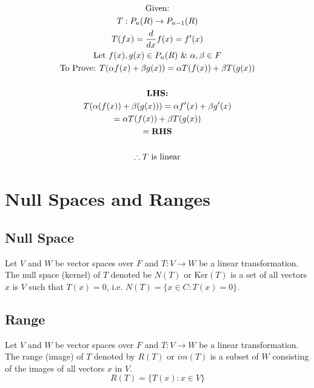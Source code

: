\documentclass[english,course,fleqn]{lecture}
\newenvironment{qanda}{\setlength{\parindent}{0pt}}{\bigskip}
\begin{document}
\begin{qanda}
  \begin{gather*}
    \text{Given:}\\
    T:P_{n}(R) \rightarrow P_{n-1}(R)\\
    T(f{x}) = \frac{d}{dx}{f(x)} = f'(x)\\
    \text{Let } f(x), g(x) \in P_{n}(R) ~\&~ \alpha, \beta \in F\\
    \text{To Prove: } T(\alpha f(x) + \beta g(x)) = \alpha T(f(x)) + \beta T(g(x))\\
    \\
    \text{\textbf{LHS:}}\\
    T(\alpha(f(x)) + \beta (g(x))) = \alpha f'(x) + \beta g'(x)\\
    = \alpha T(f(x)) + \beta T(g(x))\\
    = \text{\textbf{RHS}}\\
    \\
    \therefore \text{$T$ is linear}
  \end{gather*}
\end{qanda}

\newpage

\section{Null Spaces and Ranges}

\subsection{Null Space}

\begin{definition}
  Let $V$ and $W$ be vector spaces over $F$ and $T:V\rightarrow W$ be a linear transformation.
  The null space (kernel) of $T$ denoted be $N(T)$ or Ker$(T)$ is a set of all vectors $x$ is $V$
  such that $T(x) = 0$, i.e. $N(T) = \{x \in C:T(x) = 0 \}$.
\end{definition}

\subsection{Range}

\begin{definition}
  Let $V$ and $W$ be vector spaces over $F$ and $T:V\rightarrow W$ be a linear transformation.
  The range (image) of $T$ denoted by $R(T)$ or $im(T)$ is a subset of $W$ consisting of the images
  of all vectors $x$ in $V$.
  \[
    R(T) = \{ T(x): x \in V\}
  \]
\end{definition}
\end{document}
